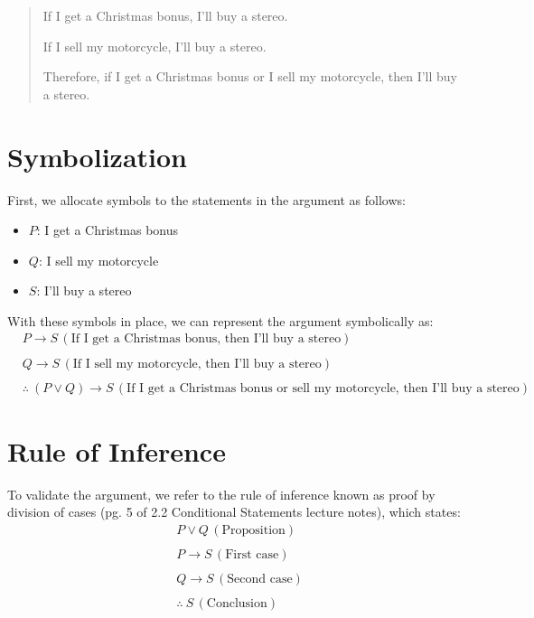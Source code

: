 \documentclass[12pt]{article}
\begin{document}
\begin{quote}
If I get a Christmas bonus, I’ll buy a stereo.

If I sell my motorcycle, I’ll buy a stereo.

Therefore, if I get a Christmas bonus or I sell my motorcycle, then I’ll buy a stereo.
\end{quote}

\section*{Symbolization}
First, we allocate symbols to the statements in the argument as follows:
\begin{itemize}
    \item \( P \): I get a Christmas bonus
    \item \( Q \): I sell my motorcycle
    \item \( S \): I’ll buy a stereo
\end{itemize}

With these symbols in place, we can represent the argument symbolically as:
\[
\begin{aligned}
& P \rightarrow S \, (\text{If I get a Christmas bonus, then I'll buy a stereo}) \\ \\
& Q \rightarrow S \, (\text{If I sell my motorcycle, then I'll buy a stereo}) \\ \\
& \therefore \ (P \lor Q) \rightarrow S \, (\text{If I get a Christmas bonus or sell my motorcycle, then I'll buy a stereo})
\end{aligned}
\]

\section*{Rule of Inference}
To validate the argument, we refer to the rule of inference known as proof by division of cases (pg. 5 of 2.2 Conditional Statements lecture notes), which states:
\[
\begin{aligned}
& P \lor Q \, (\text{Proposition}) \\ \\
& P \rightarrow S \, (\text{First case}) \\ \\
& Q \rightarrow S \, (\text{Second case}) \\ \\
& \therefore \ S \, (\text{Conclusion})
\end{aligned}
\]
\end{document}
